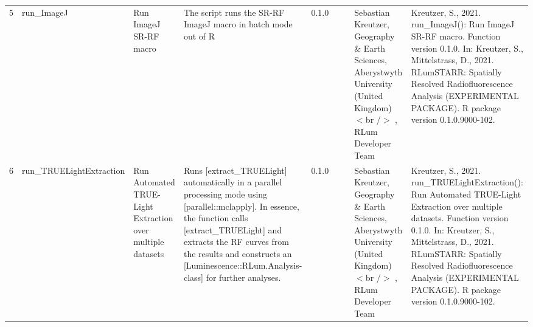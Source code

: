 \begin{table}[ht]
\begin{tabular}{rllllllll}
 \\ 
  5 & run\_ImageJ & Run ImageJ SR-RF macro & The script runs the SR-RF ImageJ macro in batch mode out of R & 0.1.0
 &  &  & Sebastian Kreutzer, Geography \& Earth Sciences, Aberystwyth University (United Kingdom)$<$br /$>$ , RLum Developer Team & Kreutzer, S., 2021. run\_ImageJ(): Run ImageJ SR-RF macro. Function version 0.1.0. In: Kreutzer, S., Mittelstrass, D., 2021. RLumSTARR: Spatially Resolved Radiofluorescence Analysis (EXPERIMENTAL PACKAGE). R package version 0.1.0.9000-102. 
 \\ 
  6 & run\_TRUELightExtraction & Run Automated TRUE-Light Extraction over multiple datasets & Runs [extract\_TRUELight] automatically in a parallel processing mode using [parallel::mclapply]. In essence, the function calls [extract\_TRUELight] and extracts the RF curves from the results and constructs an [Luminescence::RLum.Analysis-class] for further analyses. & 0.1.0
 &  &  & Sebastian Kreutzer, Geography \& Earth Sciences, Aberystwyth University (United Kingdom)$<$br /$>$ , RLum Developer Team & Kreutzer, S., 2021. run\_TRUELightExtraction(): Run Automated TRUE-Light Extraction over multiple datasets. Function version 0.1.0. In: Kreutzer, S., Mittelstrass, D., 2021. RLumSTARR: Spatially Resolved Radiofluorescence Analysis (EXPERIMENTAL PACKAGE). R package version 0.1.0.9000-102. 
 \\ 
   \hline
\end{tabular}
\end{table}

